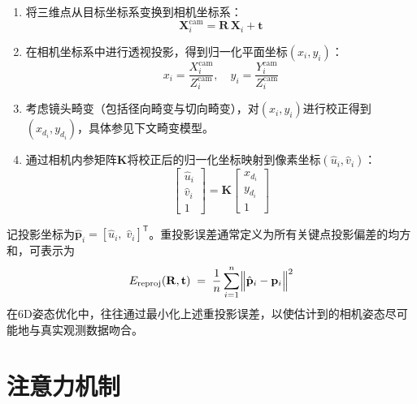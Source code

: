 \begin{enumerate}
	\item 将三维点从目标坐标系变换到相机坐标系：
	\begin{equation}
		\mathbf{X}_i^{\mathrm{cam}} = \mathbf{R}\,\mathbf{X}_i + \mathbf{t}
	\end{equation}
	\item 在相机坐标系中进行透视投影，得到归一化平面坐标$(x_i, y_i)$：
	\begin{equation}
		x_i = \frac{X_{i}^{\mathrm{cam}}}{Z_{i}^{\mathrm{cam}}}, \quad
		y_i = \frac{Y_{i}^{\mathrm{cam}}}{Z_{i}^{\mathrm{cam}}}
	\end{equation}
	\item 考虑镜头畸变（包括径向畸变与切向畸变），对$(x_i, y_i)$进行校正得到$(x_{d_i}, y_{d_i})$，具体参见下文畸变模型。
	\item 通过相机内参矩阵$\mathbf{K}$将校正后的归一化坐标映射到像素坐标$(\hat{u}_i, \hat{v}_i)$：
	\begin{equation}
		\begin{bmatrix}
			\hat{u}_i \\[3pt]
			\hat{v}_i \\[3pt]
			1 
		\end{bmatrix}
		=
		\mathbf{K}
		\begin{bmatrix}
			x_{d_i} \\[3pt]
			y_{d_i} \\[3pt]
			1
		\end{bmatrix}
	\end{equation}
\end{enumerate}

记投影坐标为$\hat{\mathbf{p}}_i = [\hat{u}_i,\;\hat{v}_i]^\mathsf{T}$。重投影误差通常定义为所有关键点投影偏差的均方和，可表示为
\begin{equation}
	E_{\mathrm{reproj}}(\mathbf{R}, \mathbf{t})
	\;=\;
	\frac{1}{n}
	\sum_{i=1}^n 
	\Bigl\|
	\hat{\mathbf{p}}_i - \mathbf{p}_i
	\Bigr\|^2
	\label{eq:reprojErrDef}
\end{equation}
在6D姿态优化中，往往通过最小化上述重投影误差，以使估计到的相机姿态尽可能地与真实观测数据吻合。

\section{注意力机制}
\label{sec:attention_mechanism}
